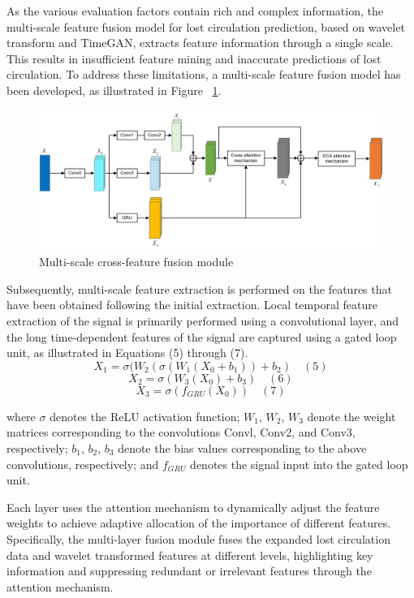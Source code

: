 \documentclass[journal,article,submit,pdftex,moreauthors]{Definitions/mdpi}
\begin{document}
As the various evaluation factors contain rich and complex information, the multi-scale feature fusion model for lost circulation prediction, based on wavelet transform and TimeGAN, extracts feature information through a single scale. This results in insufficient feature mining and inaccurate predictions of lost circulation. To address these limitations, a multi-scale feature fusion model has been developed, as illustrated in Figure ~\ref{fig:Multi-scale cross-feature fusion module}.

\begin{figure}[H]
    \centering
    \includegraphics[width=0.75\linewidth]{图片/多尺度特征注意力.png}
    \caption{Multi-scale cross-feature fusion module}
    \label{fig:Multi-scale cross-feature fusion module}
\end{figure}


Subsequently, multi-scale feature extraction is performed on the features that have been obtained following the initial extraction. Local temporal feature extraction of the signal is primarily performed using a convolutional layer, and the long time-dependent features of the signal are captured using a gated loop unit, as illustrated in Equations (5) through (7).
\[{{X}_{1}}=\sigma ({{W}_{2}}(\sigma ({{W}_{1}}({{X}_{0}}+{{b}_{1}}))+{{b}_{2}})\quad (5)\]
	\[{{X}_{2}}=\sigma ({{W}_{3}}({{X}_{0}})+{{b}_{3}})\quad (6)\]
	\[{{X}_{3}}=\sigma ({{f}_{GRU}}({{X}_{0}}))\quad (7)\]

where $\sigma$ denotes the ReLU activation function; \({{W}_{1}}\), \({{W}_{2}}\),  \({{W}_{3}}\) denote the weight matrices corresponding to the convolutions Convl, Conv2, and Conv3, respectively; \({{b}_{1}}\), \({{b}_{2}}\), \({{b}_{3}}\) denote the bias values corresponding to the above convolutions, respectively; and \({{f}_{GRU}}\) denotes the signal input into the gated loop unit.

Each layer uses the attention mechanism to dynamically adjust the feature weights to achieve adaptive allocation of the importance of different features. Specifically, the multi-layer fusion module fuses the expanded lost circulation data and wavelet transformed features at different levels, highlighting key information and suppressing redundant or irrelevant features through the attention mechanism.
\end{document}
